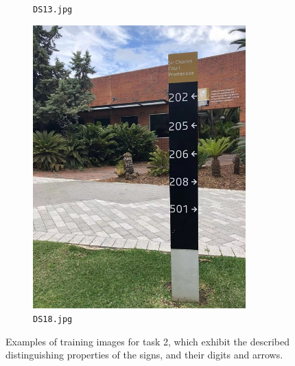 \documentclass{article}
\begin{document}
\begin{figure}[h]
\begin{subfigure}[h]{0.22\textwidth}
    \caption[DS13]{
      \lstinline{DS13.jpg}
    }
    \label{fig:ds13}
  \end{subfigure}
  \begin{subfigure}[h]{0.22\textwidth}
    \centering
    \includegraphics[width=0.9\textwidth]{../train/task2/DS18}
    \caption[DS18]{
      \lstinline{DS18.jpg}
    }
    \label{fig:ds18}
  \end{subfigure}

  \caption[Task 2 - Regular Cases]{
    Examples of training images for task 2, which exhibit the described
    distinguishing properties of the signs, and their digits and arrows.
  }
  \label{fig:problem-2-regular}
\end{figure}
\end{document}
